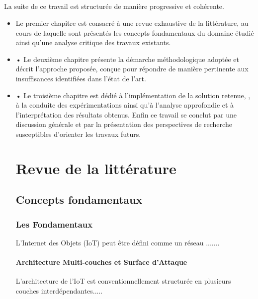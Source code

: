 \documentclass[12pt]{report}
\begin{document}
\paragraph{}La suite de ce travail est structurée de manière progressive et cohérente.
 \begin{itemize} 
     \item Le premier chapitre est consacré à une revue exhaustive de la littérature, au cours de laquelle sont présentés les concepts fondamentaux du domaine étudié ainsi qu’une analyse critique des travaux existants. 
    \item• Le deuxième chapitre présente la démarche méthodologique adoptée et décrit l’approche proposée, conçue pour répondre de manière pertinente aux insuffisances identifiées dans l’état de l’art. 
    \item•	Le troisième chapitre est dédié à l’implémentation de la solution retenue, , à la conduite des expérimentations ainsi qu’à l’analyse approfondie et à l’interprétation des résultats obtenus. Enfin ce travail se conclut par une discussion générale et par la présentation des perspectives de recherche susceptibles d’orienter les travaux futurs.
 \newpage



\chapter{Revue de la littérature}
\section{Concepts fondamentaux}

\subsection{Les Fondamentaux }

L'Internet des Objets (IoT) peut être défini comme un réseau .......

\subsubsection{Architecture Multi-couches et Surface d'Attaque}
L'architecture de l'IoT est conventionnellement structurée en plusieurs couches interdépendantes.....


\end{itemize}
\end{document}
